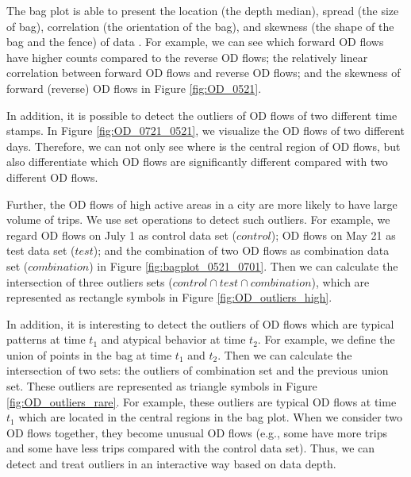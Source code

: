 \documentclass[a4paper,UKenglish]{lipics-v2016}
\begin{document}
The bag plot is able to present the location (the depth median), spread (the size of bag), correlation (the orientation of the bag), and skewness (the shape of the bag and the fence) of data \cite{rousseeuw99AS}. For example, we can see which forward OD flows have higher counts compared to the reverse OD flows; the relatively linear correlation between forward OD flows and reverse OD flows; and the skewness of forward (reverse) OD flows in Figure \ref{fig:OD_0521}. 

In addition, it is possible to detect the outliers of OD flows of two different time stamps. In Figure \ref{fig:OD_0721_0521}, we visualize the OD flows of two different days. Therefore, we can not only see where is the central region of OD flows, but also differentiate which OD flows are significantly different compared with two different OD flows.

Further, the OD flows of high active areas in a city are more likely to have large volume of trips.
We use set operations to detect such outliers. For example, we regard OD flows on July 1  as control data set ($control$); OD flows on May 21 as test data set ($test$); and the combination of two OD flows as combination data set ($combination$) in Figure \ref{fig:bagplot_0521_0701}. Then we can calculate the intersection of three outliers sets ($control \cap test \cap combination$), which are represented as rectangle symbols in Figure \ref{fig:OD_outliers_high}. 

In addition, it is interesting to detect the outliers of OD flows which are typical patterns at time $t_1$ and atypical behavior at time $t_2$.  For example, we define the union of points in the bag at time $t_1$ and $t_2$. Then we can calculate the intersection of two sets: the outliers of combination set and the previous union set. These outliers are represented as triangle symbols in Figure \ref{fig:OD_outliers_rare}. For example, these outliers are typical OD flows at time $t_1$ which are located in the central regions in the bag plot. When we consider two OD flows together, they become unusual OD flows (e.g., some have more trips and some have less trips compared with the control data set). Thus, we can detect and treat outliers in an interactive way based on data depth.

\end{document}
